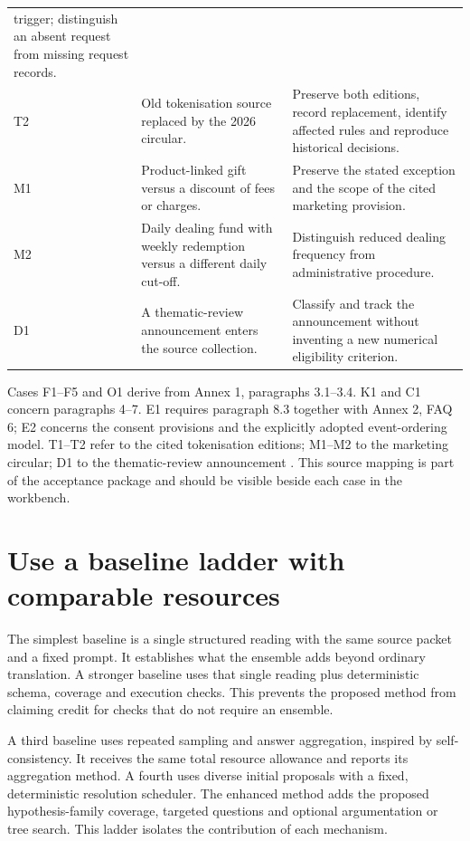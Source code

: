 \begin{longtable}{P{0.09\textwidth}P{0.41\textwidth}P{0.4\textwidth}}
trigger; distinguish an absent request from missing request records.\\
T2 & Old tokenisation source replaced by the 2026 circular. & Preserve both editions,
record replacement, identify affected rules and reproduce historical decisions.\\
M1 & Product-linked gift versus a discount of fees or charges. & Preserve the stated
exception and the scope of the cited marketing provision.\\
M2 & Daily dealing fund with weekly redemption versus a different daily cut-off. &
Distinguish reduced dealing frequency from administrative procedure.\\
D1 & A thematic-review announcement enters the source collection. & Classify and
track the announcement without inventing a new numerical eligibility criterion.\\
\bottomrule
\end{longtable}
\endgroup

Cases F1--F5 and O1 derive from Annex 1, paragraphs 3.1--3.4. K1 and C1 concern
paragraphs 4--7. E1 requires paragraph 8.3 together with Annex 2, FAQ 6; E2 concerns
the consent provisions and the explicitly adopted event-ordering model. T1--T2
refer to the cited tokenisation editions; M1--M2 to the marketing circular; D1
to the thematic-review announcement
\citep{sfcspiannex1,sfcspiannex2,sfctoken2023,sfctoken2026,sfcmarketing,sfcreview2025}.
This source mapping is part of the acceptance package and should be visible
beside each case in the workbench.

\section{Use a baseline ladder with comparable resources}
\label{merge:M09:04}


The simplest baseline is a single structured reading with the same source packet
and a fixed prompt. It establishes what the ensemble adds beyond ordinary
translation. A stronger baseline uses that single reading plus deterministic
schema, coverage and execution checks. This prevents the proposed method from
claiming credit for checks that do not require an ensemble.

A third baseline uses repeated sampling and answer aggregation, inspired by
self-consistency. It receives the same total resource allowance and reports its
aggregation method. A fourth uses diverse initial proposals with a fixed,
deterministic resolution scheduler. The enhanced method adds the proposed
hypothesis-family coverage, targeted questions and optional argumentation or tree
search. This ladder isolates the contribution of each mechanism.


